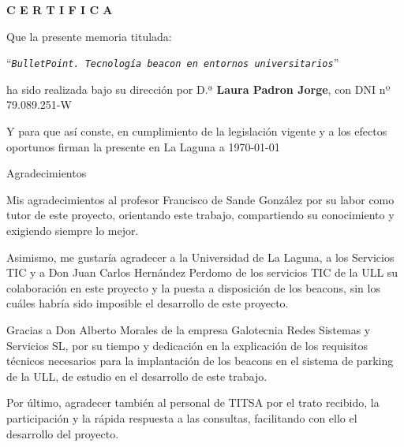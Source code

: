 \documentclass[spanish,a4paper,12pt,oneside]{extreport}
\newcommand{\BulletP}{\texttt{BulletPoint.{ Tecnología beacon en entornos universitarios}}}
\begin{document}
\bigskip

\bigskip
\bigskip
{\bf C E R T I F I C A}

\bigskip
\bigskip
\bigskip
Que la presente memoria titulada:

\bigskip
``{\it \BulletP{}}''

\bigskip
\bigskip
\bigskip
\noindent ha sido realizada bajo su dirección por D.ª {\bf Laura Padron Jorge},
con DNI nº 79.089.251-W

\bigskip
\bigskip

Y para que así conste, en cumplimiento de la legislación vigente y a los efectos
oportunos firman la presente en La Laguna a \today

\newpage
\thispagestyle{empty}

{ \flushright

\begin{LARGE}
Agradecimientos
\end{LARGE}

\hspace{3mm}

\begin{large}


\hspace{3mm}

Mis agradecimientos al profesor Francisco de Sande González por su labor como tutor de este proyecto, orientando este trabajo, compartiendo su conocimiento y exigiendo siempre lo mejor. 

Asimismo, me gustaría agradecer a la Universidad de La Laguna, a los Servicios TIC y a Don Juan Carlos Hernández Perdomo de los servicios TIC de la ULL su colaboración en este proyecto y la puesta a disposición de los beacons, sin los cuáles habría sido imposible el desarrollo de este proyecto. 

Gracias a Don Alberto Morales de la empresa Galotecnia Redes Sistemas y Servicios SL, por su tiempo y dedicación en la explicación de los requisitos técnicos necesarios para la implantación de los beacons en el sistema de parking de la ULL, de estudio en el desarrollo de este trabajo.

Por último, agradecer también al personal de TITSA por el trato recibido, la participación y la rápida respuesta a las consultas, facilitando con ello el desarrollo del proyecto.


\end{large}

}
\end{document}
